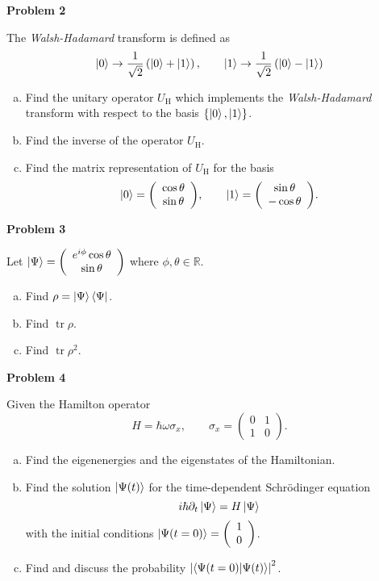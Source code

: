 \documentclass[a4paper,12pt]{article}
\renewcommand{\vector}[2]{{\left(\begin{array}{c} #1 \\ #2 \end{array}\right)}}
\DeclareMathOperator{\Tr}{tr}
\newcommand{\Problem}[1]{
  {
  \vspace*{0.5cm}
  \textsf{\textbf{Problem #1}}
  \vspace*{0.2cm}
  
  }
}
\begin{document}
\Problem{2}
The {\it Walsh-Hadamard} transform is defined as
\begin{equation}
\ket{0} \rightarrow \frac{1}{\sqrt 2}\left(\ket{0}+\ket{1}\right), \quad\quad \ket{1} \rightarrow \frac{1}{\sqrt 2}\left(\ket{0}-\ket{1}\right)
\end{equation}
\begin{enumerate}[a)]
    \item Find the unitary operator $U_\text{H}$ which implements the {\it Walsh-Hadamard} transform with respect to the basis $\{ \ket{0}, \ket{1} \}$.
    \item Find the inverse of the operator $U_\text{H}$.
    \item Find the matrix representation of $U_\text{H}$ for the basis
    \begin{equation}
    \ket{0} = \vector{\cos\theta}{\sin\theta}, \quad\quad \ket{1} = \vector{\sin\theta}{-\cos\theta}.
    \end{equation}
\end{enumerate}

\Problem{3}
Let $\ket{\Psi} = \vector{e^{i\phi}\cos\theta}{\sin\theta}$ where $\phi,\theta \in \mathbb{R}$.
\begin{enumerate}[a)]
    \item Find $\rho = \ket{\Psi}\bra{\Psi}$.
    \item Find $\Tr{\rho}$.
    \item Find $\Tr \rho^2$.
\end{enumerate}

\Problem{4}
Given the Hamilton operator
\begin{equation}
H = \hbar\omega\sigma_x, \quad\quad \sigma_x = \left(\begin{array}{cc} 0 & 1 \\ 1 & 0 \end{array}\right).
\end{equation}
\begin{enumerate}[a)]
    \item Find the eigenenergies and the eigenstates of the Hamiltonian.
    \item Find the solution $\ket{\Psi(t)}$ for the time-dependent Schrödinger equation
    \begin{equation}
    i\hbar\partial_t \ket{\Psi} = H\ket{\Psi}
    \end{equation}
    with the initial conditions $\ket{\Psi(t=0)} = \vector{1}{0}$.
    \item Find and discuss the probability $\left|\braket{\Psi(t=0)|\Psi(t)}\right|^2$.
\end{enumerate}
\end{document}
